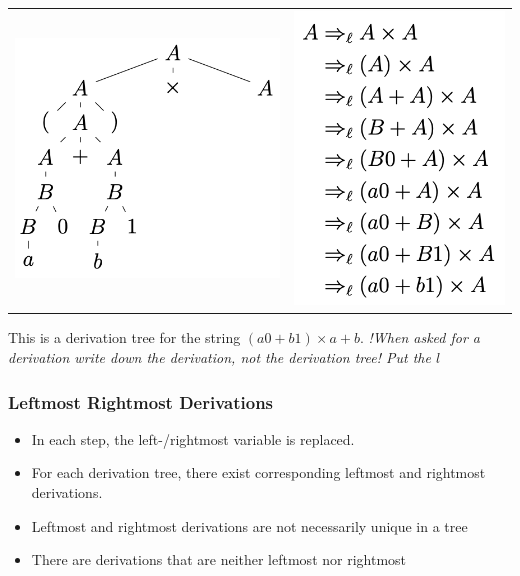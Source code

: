 \documentclass[a3paper, 8pt]{extarticle}
\begin{document}
\begin{multicols*}{6}
\begin{center}
   \begin{tabular}{c c}
      \includegraphics[width=0.5\columnwidth]{images/Screen Shot 2023-01-11 at 17.39.38.png}    &  \includegraphics[width= 0.37\columnwidth]{images/Screen Shot 2023-01-11 at 17.39.41.png}
    \end{tabular}
\end{center}
This is a derivation tree for the string $(a0+b1)\times a+b$. \textit{!When asked for a derivation write down the derivation, not the derivation tree! Put the $l$}

\subsubsection{Leftmost Rightmost Derivations}
\begin{itemize}
    \item In each step, the left-/rightmost variable is replaced. 
    \item For each derivation tree, there exist corresponding leftmost and rightmost derivations. 
    \item Leftmost and rightmost derivations are not necessarily unique in a tree
    \item There are derivations that are neither leftmost nor rightmost
\end{itemize}




\end{multicols*}
\end{document}
